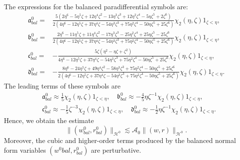 \documentclass[10pt]{amsart}
\theoremstyle{remark}
\theoremstyle{definition}
\numberwithin{equation}{section}
\renewcommand{\H}{{\mathcal H }}
\newcommand{\f}{\frac}
\begin{document}
The expressions for the balanced paradifferential symbols are:
\begin{align*}
\mathfrak{a}^0_{bal}=&\f{5(2\eta^6-5\eta^5\zeta+12\eta^4\zeta^2-13\eta^3\zeta^3+12\eta^2\zeta^4-5\eta\zeta^5+2\zeta^6)}{2(4\eta^6-12\eta^5\zeta+37\eta^4\zeta-54\eta^3\zeta^3+75\eta^2\zeta^4-50\eta\zeta^5+25\zeta^6)}\chi_{2}(\eta, \zeta)1_{\zeta<\eta},\\
\mathfrak{b}^0_{bal}=&\f{2\eta^6-11\eta^5\zeta+11\eta^4\zeta^2-17\eta^3\zeta^3-25\eta^2\zeta^4+25\eta\zeta^5-25\zeta^6}{2(4\eta^6-12\eta^5\zeta+37\eta^4\zeta-54\eta^3\zeta^3+75\eta^2\zeta^4-50\eta\zeta^5+25\zeta^6)}\chi_{2}(\eta, \zeta)1_{\zeta<\eta},\\
\mathfrak{c}^0_{bal}=&-\f{5\zeta(\eta^2-\eta\zeta+\zeta^2)}{4\eta^6-12\eta^5\zeta+37\eta^4\zeta-54\eta^3\zeta^3+75\eta^2\zeta^4-50\eta\zeta^5+25\zeta^6}\chi_{2}(\eta, \zeta)1_{\zeta<\eta},\\
\mathfrak{d}^0_{bal}=&-\f{8\eta^6-24\eta^5\zeta+49\eta^4\zeta^2-58\eta^3\zeta^3+75\eta^2\zeta^4-50\eta\zeta^5+25\zeta^6}{2(4\eta^6-12\eta^5\zeta+37\eta^4\zeta-54\eta^3\zeta^3+75\eta^2\zeta^4-50\eta\zeta^5+25\zeta^6)}\chi_{2}(\eta, \zeta)1_{\zeta<\eta}.
\end{align*}
The leading terms of these symbols are
\begin{align*}
&\mathfrak{a}^0_{bal} \approx \f15\chi_{2}(\eta, \zeta)1_{\zeta<\eta}, \quad \mathfrak{b}^0_{bal} \approx -\f45\eta\zeta^{-1}\chi_{2}(\eta, \zeta)1_{\zeta<\eta},\\ &\mathfrak{c}^0_{bal} \approx -\f15\zeta^{-3}\chi_{2}(\eta, \zeta)1_{\zeta<\eta}, \quad \mathfrak{d}^0_{bal} \approx -\f12\eta\zeta^{-1}\chi_{2}(\eta, \zeta)1_{\zeta<\eta}.   
\end{align*}
Hence, we obtain the estimate
\begin{equation*}
    \|(w^0_{bal}, r^0_{bal})\|_{\H^0} \lesssim \mathcal{A}_{0}\|(w,r)\|_{\H^0}.
\end{equation*}
Moreover, the cubic and higher-order terms produced by the balanced normal form variables $(w^0{bal}, r^0_{bal})$ are perturbative.
\end{document}
